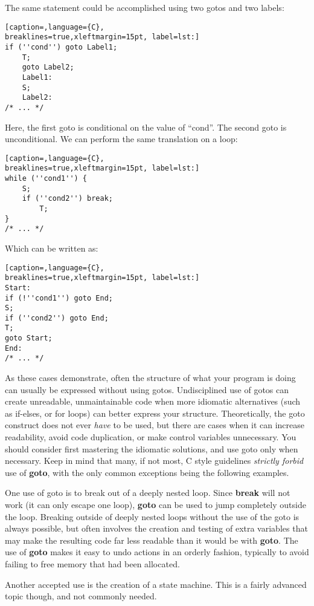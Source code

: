 The same statement could be accomplished using two gotos and two labels:
\lstset{basicstyle=\scriptsize, numbers=left, captionpos=b, tabsize=4}
\begin{lstlisting}[caption=,language={C},
breaklines=true,xleftmargin=15pt, label=lst:]
if (''cond'') goto Label1;
	T;
	goto Label2;
	Label1:
	S;
	Label2:
/* ... */
\end{lstlisting}

Here, the first goto is conditional on the value of ``cond''. The second goto
is unconditional. We can perform the same translation on a loop:
\lstset{basicstyle=\scriptsize, numbers=left, captionpos=b, tabsize=4}
\begin{lstlisting}[caption=,language={C},
breaklines=true,xleftmargin=15pt, label=lst:]
while (''cond1'') {
	S;
	if (''cond2'') break;
		T;
}
/* ... */
\end{lstlisting}

Which can be written as:
\lstset{basicstyle=\scriptsize, numbers=left, captionpos=b, tabsize=4}
\begin{lstlisting}[caption=,language={C},
breaklines=true,xleftmargin=15pt, label=lst:]
Start:
if (!''cond1'') goto End;
S;
if (''cond2'') goto End;
T;
goto Start;
End:
/* ... */
\end{lstlisting}

As these cases demonstrate, often the structure of what your program is doing
can usually be expressed without using gotos. Undisciplined use of gotos can
create unreadable, unmaintainable code when more idiomatic alternatives (such
as if-elses, or for loops) can better express your structure. Theoretically,
the goto construct does not ever \emph{have} to be used, but there are cases
when it can increase readability, avoid code duplication, or make control
variables unnecessary. You should consider first mastering the idiomatic
solutions, and use goto only when necessary. Keep in mind that many, if not
most, C style guidelines \emph{strictly forbid} use of \textbf{goto}, with the
only common exceptions being the following examples.

One use of goto is to break out of a deeply nested loop. Since \textbf{break}
will not work (it can only escape one loop), \textbf{goto} can be used to jump
completely outside the loop. Breaking outside of deeply nested loops without
the use of the goto is always possible, but often involves the creation and
testing of extra variables that may make the resulting code far less readable
than it would be with \textbf{goto}. The use of \textbf{goto} makes it easy to
undo actions in an orderly fashion, typically to avoid failing to free memory
that had been allocated.

Another accepted use is the creation of a state machine. This is a fairly
advanced topic though, and not commonly needed.
